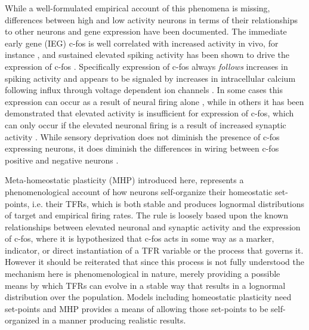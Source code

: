 \documentclass[10pt,letterpaper]{article}
\begin{document}
While a well-formulated empirical account of this phenomena is missing, differences between high and low activity neurons in terms of their relationships to other neurons and gene expression have been documented. The immediate early gene (IEG) c-fos is well correlated with increased activity in vivo, for instance \cite{yassin2010embedded} , and sustained elevated spiking activity has been shown to drive the expression of c-fos \cite{luckman1994induction, fields1997action, schoenenberger2009temporal}. Specifically expression of c-fos always \emph{follows} increases in spiking activity and appears to be signaled by increases in intracellular calcium following influx through voltage dependent ion channels \cite{luckman1994induction}.  In some cases this expression can occur as a result of neural firing alone \cite{fields1997action}\cite{schoenenberger2009temporal}, while in others it has been demonstrated that elevated activity is insufficient for expression of c-fos, which can only occur if the elevated neuronal firing is a result of increased synaptic activity \cite{luckman1994induction}. While sensory deprivation does not diminish the presence of c-fos expressing neurons, it does diminish the differences in wiring between c-fos positive and negative neurons \cite{benedetti2012differential}.

Meta-homeostatic plasticity (MHP) introduced here, represents a phenomenological account of how neurons self-organize their homeostatic set-points, i.e. their TFRs, which is both stable and produces lognormal distributions of target and empirical firing rates. The rule is loosely based upon the known relationships between elevated neuronal and synaptic activity and the expression of c-fos, where it is hypothesized that c-fos acts in some way as a marker, indicator, or direct instantiation of a TFR variable or the process that governs it. However it should be reiterated that since this process is not fully understood the mechanism here is phenomenological in nature, merely providing a possible means by which TFRs can evolve in a stable way that results in a lognormal distribution over the population. Models including homeostatic plasticity need set-points and MHP provides a means of allowing those set-points to be self-organized in a manner producing realistic results. 
\end{document}
